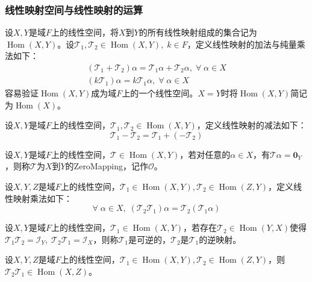 \subsubsection{线性映射空间与线性映射的运算}
\begin{definition}
	设$X,Y$是域$F$上的线性空间，将$X$到$Y$的所有线性映射组成的集合记为$\operatorname{Hom}(X,Y)$。设$\mathcal{T}_1,\mathcal{T}_2\in\operatorname{Hom}(X,Y),\;k\in F$，定义线性映射的加法与纯量乘法如下：
	\begin{gather*}
		(\mathcal{T}_1+\mathcal{T}_2)\alpha=\mathcal{T}_1\alpha+\mathcal{T}_2\alpha,\;\forall\;\alpha\in X \\
		(k\mathcal{T}_1)\alpha=k\mathcal{T}_1\alpha,\;\forall\;\alpha\in X
	\end{gather*}
	容易验证$\operatorname{Hom}(X,Y)$成为域$F$上的一个线性空间。$X=Y$时将$\operatorname{Hom}(X,Y)$简记为$\operatorname{Hom}(X)$。
\end{definition}
\begin{definition}
	设$X,Y$是域$F$上的线性空间，$\mathcal{T}_1,\mathcal{T}_2\in\operatorname{Hom}(X,Y)$，定义线性映射的减法如下：
	\begin{equation*}
		\mathcal{T}_1-\mathcal{T}_2=\mathcal{T}_1+(-\mathcal{T}_2)
	\end{equation*}
\end{definition}
\begin{definition}
	设$X,Y$是域$F$上的线性空间，$\mathcal{T}\in\operatorname{Hom}(X,Y)$，若对任意的$\alpha\in X$，有$\mathcal{T}\alpha=\mathbf{0}_Y$，则称$\mathcal{T}$为$X$到$Y$的\gls{ZeroMapping}，记作$\mathcal{O}$。
\end{definition}
\begin{definition}
	设$X,Y,Z$是域$F$上的线性空间，$\mathcal{T}_1\in\operatorname{Hom}(X,Y),\mathcal{T}_2\in\operatorname{Hom}(Z,Y)$，定义线性映射乘法如下：
	\begin{equation*}
		\forall\;\alpha\in X,\;(\mathcal{T}_2\mathcal{T}_1)\alpha=\mathcal{T}_2(\mathcal{T}_1\alpha)
	\end{equation*}
\end{definition}
\begin{definition}
	设$X,Y$是域$F$上的线性空间，$\mathcal{T}_1\in\operatorname{Hom}(X,Y)$，若存在$\mathcal{T}_2\in\operatorname{Hom}(Y,X)$使得$\mathcal{T}_1\mathcal{T}_2=\mathcal{I}_Y,\;\mathcal{T}_2\mathcal{T}_1=\mathcal{I}_X$，则称$\mathcal{T}_1$是可逆的，$\mathcal{T}_2$是$\mathcal{T}_1$的逆映射。
\end{definition}
\begin{theorem}
	设$X,Y,Z$是域$F$上的线性空间，$\mathcal{T}_1\in\operatorname{Hom}(X,Y),\mathcal{T}_2\in\operatorname{Hom}(Z,Y)$，则$\mathcal{T}_2\mathcal{T}_1\in\operatorname{Hom}(X,Z)$。
\end{theorem}
